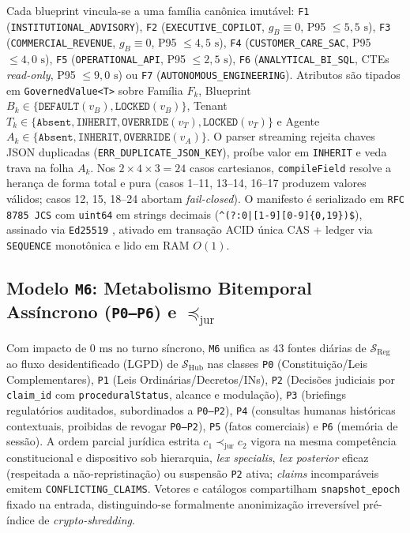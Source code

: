 \documentclass[10pt,twocolumn]{article}
\begin{document}
Cada blueprint vincula-se a uma fam\'ilia can\^onica imut\'avel: \texttt{F1} (\texttt{INSTITUTIONAL\_ADVISORY}), \texttt{F2} (\texttt{EXECUTIVE\_COPILOT}, $g_B\equiv 0$, P95 $\le 5,5\text{ s}$), \texttt{F3} (\texttt{COMMERCIAL\_REVENUE}, $g_B\equiv 0$, P95 $\le 4,5\text{ s}$), \texttt{F4} (\texttt{CUSTOMER\_CARE\_SAC}, P95 $\le 4,0\text{ s}$), \texttt{F5} (\texttt{OPERATIONAL\_API}, P95 $\le 2,5\text{ s}$), \texttt{F6} (\texttt{ANALYTICAL\_BI\_SQL}, CTEs \emph{read-only}, P95 $\le 9,0\text{ s}$) ou \texttt{F7} (\texttt{AUTONOMOUS\_ENGINEERING}). Atributos s\~ao tipados em \texttt{GovernedValue<T>} sobre Fam\'ilia $F_k$, Blueprint $B_k \in \{\texttt{DEFAULT}(v_B),\texttt{LOCKED}(v_B)\}$, Tenant $T_k \in \{\texttt{Absent},\texttt{INHERIT},\texttt{OVERRIDE}(v_T),\texttt{LOCKED}(v_T)\}$ e Agente $A_k \in \{\texttt{Absent},\texttt{INHERIT},\texttt{OVERRIDE}(v_A)\}$. O parser streaming rejeita chaves JSON duplicadas (\texttt{ERR\_DUPLICATE\_JSON\_KEY}), pro\'ibe valor em \texttt{INHERIT} e veda trava na folha $A_k$. Nos $2\times 4\times 3 = 24$ casos cartesianos, \texttt{compileField} resolve a heran\c{c}a de forma total e pura (casos 1--11, 13--14, 16--17 produzem valores v\'alidos; casos 12, 15, 18--24 abortam \emph{fail-closed}). O manifesto \'e serializado em \texttt{RFC 8785 JCS} \cite{rundgren2020jcs} com \texttt{uint64} em strings decimais (\texttt{\^{}(?:0|[1-9][0-9]\{0,19\})\$}), assinado via \texttt{Ed25519} \cite{josefsson2017eddsa}, ativado em transa\c{c}\~ao ACID \'unica CAS + ledger via \texttt{SEQUENCE} monot\^onica e lido em RAM $O(1)$.

\subsection{Modelo \texttt{M6}: Metabolismo Bitemporal Ass\'incrono (\texttt{P0--P6}) e $\preceq_{\mathrm{jur}}$}

Com impacto de $0\text{ ms}$ no turno s\'incrono, \texttt{M6} unifica as $43$ fontes di\'arias de $\mathcal{S}_{\mathrm{Reg}}$ ao fluxo desidentificado (LGPD) de $\mathcal{S}_{\mathrm{Hub}}$ nas classes \texttt{P0} (Constitui\c{c}\~ao/Leis Complementares), \texttt{P1} (Leis Ordin\'arias/Decretos/INs), \texttt{P2} (Decis\~oes judiciais por \texttt{claim\_id} com \texttt{proceduralStatus}, alcance e modula\c{c}\~ao), \texttt{P3} (briefings regulat\'orios auditados, subordinados a \texttt{P0--P2}), \texttt{P4} (consultas humanas hist\'oricas contextuais, proibidas de revogar \texttt{P0--P2}), \texttt{P5} (fatos comerciais) e \texttt{P6} (mem\'oria de sess\~ao). A ordem parcial jur\'idica estrita $c_1 \prec_{\mathrm{jur}} c_2$ vigora na mesma compet\^encia constitucional e dispositivo sob hierarquia, \emph{lex specialis}, \emph{lex posterior} eficaz (respeitada a n\~ao-repristina\c{c}\~ao) ou suspens\~ao \texttt{P2} ativa; \emph{claims} incompar\'aveis emitem \texttt{CONFLICTING\_CLAIMS}. Vetores e cat\'alogos compartilham \texttt{snapshot\_epoch} fixado na entrada, distinguindo-se formalmente anonimiza\c{c}\~ao irrevers\'ivel pr\'e-\'indice de \emph{crypto-shredding}.
\end{document}
